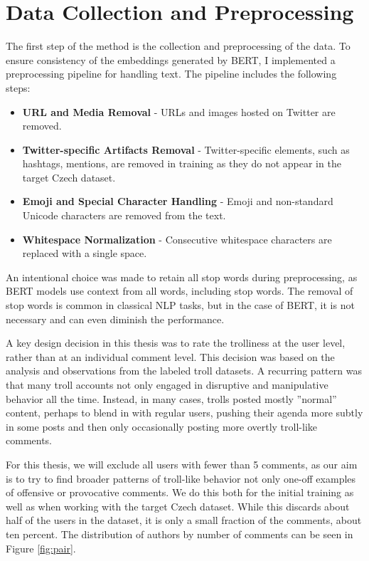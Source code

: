 \documentclass[twoside]{ctuthesis}
\theoremstyle{plain}
\theoremstyle{definition}
\theoremstyle{note}
\begin{document}
\section{Data Collection and Preprocessing}
The first step of the method is the collection and preprocessing of the data. To ensure consistency of the embeddings generated by BERT, I implemented a preprocessing pipeline for handling text. The pipeline includes the following steps:
\begin{itemize}
  \item \textbf{URL and Media Removal} - URLs and images hosted on Twitter are removed.
  \item \textbf{Twitter-specific Artifacts Removal} - Twitter-specific elements, such as hashtags, mentions, are removed in training as they do not appear in the target Czech dataset.
  \item \textbf{Emoji and Special Character Handling} - Emoji and non-standard Unicode characters are removed from the text.
  \item \textbf{Whitespace Normalization} - Consecutive whitespace characters are replaced with a single space.
\end{itemize}
An intentional choice was made to retain all stop words during preprocessing, as BERT models use context from all words, including stop words. The removal of stop words is common in classical NLP tasks, but in the case of BERT, it is not necessary and can even diminish the performance.\par

A key design decision in this thesis was to rate the trolliness at the user level, rather than at an individual comment level. This decision was based on the analysis and observations from the labeled troll datasets. A recurring pattern was that many troll accounts not only engaged in disruptive and manipulative behavior all the time. Instead, in many cases, trolls posted mostly ''normal'' content, perhaps to blend in with regular users, pushing their agenda more subtly in some posts and then only occasionally posting more overtly troll-like comments.\par
For this thesis, we will exclude all users with fewer than 5 comments, as our aim is to try to find broader patterns of troll-like behavior not only one-off examples of offensive or provocative comments. We do this both for the initial training as well as when working with the target Czech dataset. While this discards about half of the users in the dataset, it is only a small fraction of the comments, about ten percent. The distribution of authors by number of comments can be seen in Figure \ref{fig:pair}.\par
\end{document}
